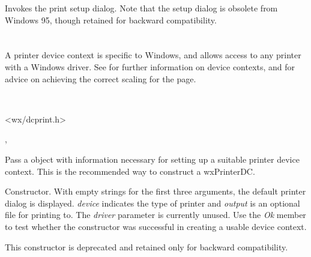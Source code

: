 
Invokes the print setup dialog. Note that the setup dialog is obsolete from
Windows 95, though retained for backward compatibility.

\section{}\label{wxprinterdc}

A printer device context is specific to Windows, and allows access to
any printer with a Windows driver. See  for further information
on device contexts, and  for advice on
achieving the correct scaling for the page.


\\


<wx/dcprint.h>


, 




Pass a  object with information
necessary for setting up a suitable printer device context. This
is the recommended way to construct a wxPrinterDC.


Constructor. With empty strings for the first three arguments, the default printer dialog is
displayed. {\it device} indicates the type of printer and {\it output}
is an optional file for printing to. The {\it driver} parameter is
currently unused.  Use the {\it Ok} member to test whether the
constructor was successful in creating a usable device context.

This constructor is deprecated and retained only for backward compatibility.

\section{}\label{wxprintout}

